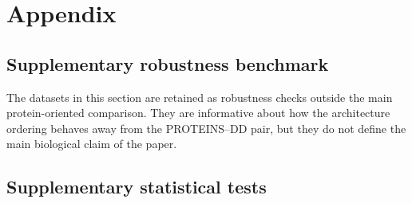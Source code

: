 \appendix

\section{Appendix}
\label{sec:appendix}

\subsection{Supplementary robustness benchmark}

The datasets in this section are retained as robustness checks outside the main protein-oriented comparison. They are informative about how the architecture ordering behaves away from the PROTEINS--DD pair, but they do not define the main biological claim of the paper.



\subsection{Supplementary statistical tests}


